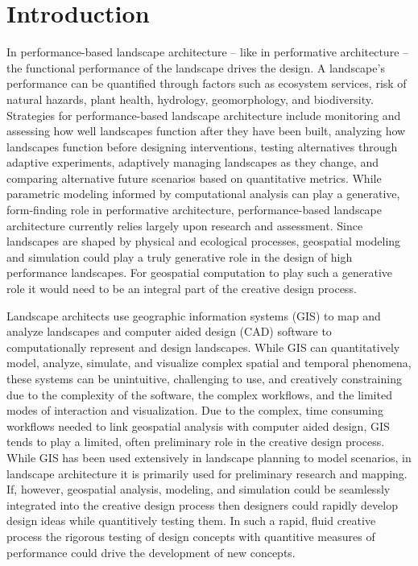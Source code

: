 \documentclass[Afour,sagev,times]{sagej} %
\begin{document}
\maketitle


\section{Introduction}

In performance-based landscape architecture 
-- like in performative architecture \cite{Kolarevic2005} --
the functional performance of the landscape drives the design.
A landscape's performance 
can be quantified through factors such as
ecosystem services, risk of natural hazards, plant health, 
hydrology, geomorphology, and biodiversity. 
Strategies for performance-based landscape architecture include
monitoring and assessing how well landscapes function
after they have been built, \cite{Yang2016}
analyzing how landscapes function before designing interventions,
testing alternatives through adaptive experiments,
adaptively managing landscapes as they change, 
and comparing alternative future scenarios 
based on quantitative metrics. \cite{Lovell2015}
While parametric modeling informed by computational analysis 
can play a generative, form-finding role 
in performative architecture, 
performance-based landscape architecture 
currently relies largely upon research and assessment.
Since landscapes are shaped by physical and ecological processes,
geospatial modeling and simulation could play a truly generative role 
in the design of high performance landscapes.
%
For geospatial computation to 
play such a generative role
it would need to be an integral part 
of the creative design process.

Landscape architects use 
geographic information systems (GIS) to map and analyze landscapes
and computer aided design (CAD) software
to computationally represent and design landscapes.
While GIS can quantitatively model, analyze, simulate, and visualize 
complex spatial and temporal phenomena,
these systems can be unintuitive, 
challenging to use, and creatively constraining
due to the complexity of the software, 
the complex workflows, 
and the limited modes of interaction and visualization. 
\cite{Ratti2004}
Due to the complex, time consuming workflows 
needed to link geospatial analysis with computer aided design, 
GIS tends to play a limited, 
often preliminary role in the creative design process.
While GIS has been used extensively in landscape planning 
to model scenarios, \cite{Steinitz2004,Baker2004,Steinitz2012}
in landscape architecture
it is primarily used for preliminary research and mapping.
If, however, geospatial analysis, modeling, and simulation
could be seamlessly integrated into the creative design process 
then designers could rapidly develop design ideas
while quantitively testing them. 
In such a rapid, fluid creative process
the rigorous testing of design concepts 
with quantitive measures of performance 
could drive the development of new concepts.
\end{document}
